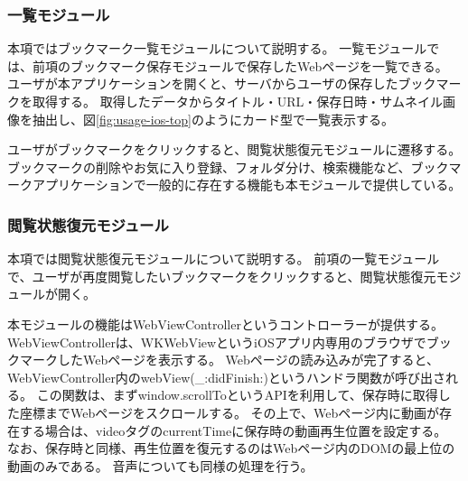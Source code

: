 \subsubsection{一覧モジュール}
本項ではブックマーク一覧モジュールについて説明する。
一覧モジュールでは、前項のブックマーク保存モジュールで保存したWebページを一覧できる。
ユーザが本アプリケーションを開くと、サーバからユーザの保存したブックマークを取得する。
取得したデータからタイトル・URL・保存日時・サムネイル画像を抽出し、図\ref{fig:usage-ios-top}のようにカード型で一覧表示する。

ユーザがブックマークをクリックすると、閲覧状態復元モジュールに遷移する。
ブックマークの削除やお気に入り登録、フォルダ分け、検索機能など、ブックマークアプリケーションで一般的に存在する機能も本モジュールで提供している。

\subsubsection{閲覧状態復元モジュール}
\label{sec:impl-client-ios-restore-module}

本項では閲覧状態復元モジュールについて説明する。
前項の一覧モジュールで、ユーザが再度閲覧したいブックマークをクリックすると、閲覧状態復元モジュールが開く。

本モジュールの機能はWebViewControllerというコントローラーが提供する。
WebViewControllerは、WKWebViewというiOSアプリ内専用のブラウザでブックマークしたWebページを表示する。
Webページの読み込みが完了すると、WebViewController内のwebView(\_:didFinish:)\cite{did-finish}というハンドラ関数が呼び出される。
この関数は、まずwindow.scrollToというAPIを利用して、保存時に取得した座標までWebページをスクロールする。
その上で、Webページ内に動画が存在する場合は、videoタグのcurrentTimeに保存時の動画再生位置を設定する。
なお、保存時と同様、再生位置を復元するのはWebページ内のDOMの最上位の動画のみである。
音声についても同様の処理を行う。

